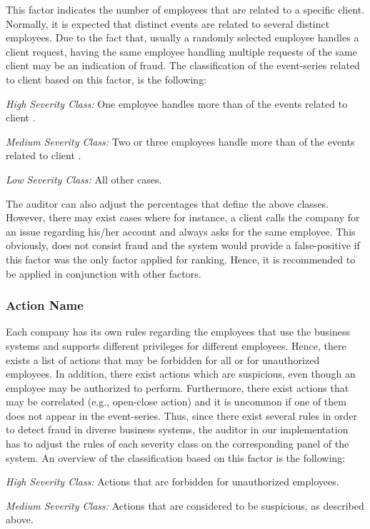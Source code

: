 \documentclass[conference]{IEEEtran}
\begin{document}
This factor indicates the number of employees that are related to a
specific client. Normally, it is expected that distinct events are
related to several distinct employees. Due to the fact that, usually
a randomly selected employee handles a client request, having the
same employee handling multiple requests of the same client may be
an indication of fraud. The classification of the event-series
related to client  based on this factor, is the following:

\emph{High Severity Class:} One employee handles more than  of
the events related to client .

\emph{ Medium Severity Class: }Two or three employees handle more
than  of the events related to client .

\emph{Low Severity Class:} All other cases.

The auditor can also adjust the percentages that define the above
classes. However, there may exist cases where for instance, a client
calls the company for an issue regarding his/her account and always
asks for the same employee. This obviously, does not consist fraud
and the system would provide a false-positive if this factor was the
only factor applied for ranking. Hence, it is recommended to be
applied in conjunction with other factors.


\subsubsection{Action Name}

Each company has its own rules regarding the employees that use the
business systems and supports different privileges for different
employees. Hence, there exists a list of actions that may be
forbidden for all or for unauthorized employees. In addition, there
exist actions which are suspicious, even though an employee may be
authorized to perform. Furthermore, there exist actions that may be
correlated (e.g., open-close action) and it is uncommon if one of
them does not appear in the event-series. Thus, since there exist
several rules in order to detect fraud in diverse business systems,
the auditor in our implementation has to adjust the rules of each
severity class on the corresponding panel of the system. An overview
of the classification based on this factor is the following:

\emph{High Severity Class:} Actions that are forbidden for
unauthorized employees.

\emph{Medium Severity Class:} Actions that are considered to be
  suspicious, as described above.
\end{document}
